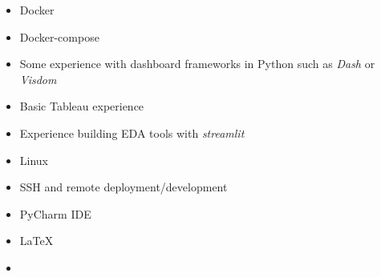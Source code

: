 
\begin{itemize}
\item Docker
\item Docker-compose

\end{itemize}

\begin{itemize}
\item Some experience with dashboard frameworks in Python such as \textit{Dash} or \textit{Visdom}
\item Basic Tableau experience
\item Experience building EDA tools with \textit{streamlit}

\end{itemize}

\begin{itemize}
\item Linux {\faLinux}
\item SSH and remote deployment/development
\item PyCharm IDE
\item \LaTeX
\item  {\faGit}
\end{itemize}

%
%






